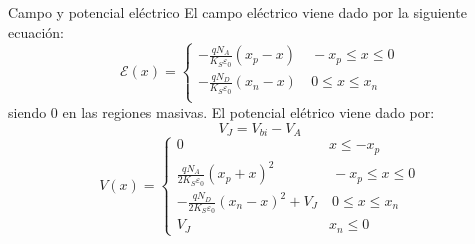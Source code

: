 \documentclass[aspectratio=169,xcolor=dvipsnames]{beamer}
\newcommand{\parentesis}[1]{\left( #1  \right)}
\newcommand{\Ecal}{\mathcal{E}}
\begin{document}
\begin{frame}{Campo y potencial eléctrico}
    El campo eléctrico viene dado por la siguiente ecuación: 
    \begin{equation*}
        \Ecal(x) = \left\lbrace \begin{array}{ll}
            - \frac{qN_A}{K_S\varepsilon_0} \parentesis{x_p - x}  & \ - x_p \leq x \leq 0 \\
            - \frac{qN_D}{K_S\varepsilon_0} \parentesis{x_n - x} & \ 0 \leq x \leq x_n \\
        \end{array} \right.
    \end{equation*}
    siendo 0 en las regiones masivas. El potencial elétrico viene dado por: 
    \begin{equation*}
        V_{J} = V_{bi} - V_A
    \end{equation*}
    \begin{equation*}
        V(x) = \left\lbrace \begin{array}{ll}
            0  & x \leq -x_p  \\
            \frac{qN_A}{2K_S\varepsilon_0} \parentesis{x_p + x}^2  & \ - x_p \leq x \leq 0 \\
            - \frac{qN_D}{2K_S\varepsilon_0} \parentesis{x_n - x}^2 + V_{J}  & \ 0 \leq x \leq x_n \\
            V_{J} & x_n \leq 0
        \end{array} \right.
    \end{equation*}
\end{frame}
\end{document}
